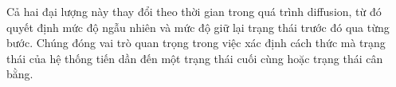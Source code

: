 Cả hai đại lượng này thay đổi theo thời gian trong quá trình diffusion, từ đó quyết định mức độ ngẫu nhiên và mức độ giữ lại trạng thái trước đó qua từng bước. Chúng đóng vai trò quan trọng trong việc xác định cách thức mà trạng thái của hệ thống tiến dần đến một trạng thái cuối cùng hoặc trạng thái cân bằng.






